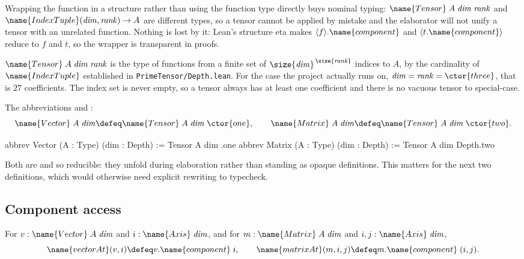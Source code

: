 Wrapping the function in a structure rather than using the function type
directly buys nominal typing: $\name{Tensor}\;A\;\mathit{dim}\;\mathit{rank}$
and $\name{IndexTuple}(\mathit{dim},\mathit{rank}) \to A$ are different
types, so a tensor cannot be applied by mistake and the elaborator will not
unify a tensor with an unrelated function.  Nothing is lost by it: Lean's
structure eta makes $\langle f \rangle.\name{component}$ and
$\langle t.\name{component} \rangle$ reduce to $f$ and $t$, so the wrapper is
transparent in proofs.

\begin{remark}[Size]\label{Tensor:Basic:rem:size}
$\name{Tensor}\;A\;\mathit{dim}\;\mathit{rank}$ is the type of functions from
a finite set of $\size{\mathit{dim}}^{\,\size{\mathit{rank}}}$ indices to $A$,
by the cardinality of $\name{IndexTuple}$ established in
\texttt{PrimeTensor/Depth.lean}.  For the case the project actually runs on,
$\mathit{dim} = \mathit{rank} = \ctor{three}$, that is $27$ coefficients.  The
index set is never empty, so a tensor always has at least one coefficient and
there is no vacuous tensor to special-case.
\end{remark}

\begin{definition}\label{Tensor:Basic:def:aliases}
The abbreviations  and :
\[
  \name{Vector}\;A\;\mathit{dim} \defeq
    \name{Tensor}\;A\;\mathit{dim}\;\ctor{one},
  \qquad
  \name{Matrix}\;A\;\mathit{dim} \defeq
    \name{Tensor}\;A\;\mathit{dim}\;\ctor{two}.
\]
\end{definition}

\begin{leancode}
abbrev Vector (A : Type) (dim : Depth) := Tensor A dim .one
abbrev Matrix (A : Type) (dim : Depth) := Tensor A dim Depth.two
\end{leancode}

Both are  and so reducible: they unfold during elaboration rather
than standing as opaque definitions.  This matters for the next two
definitions, which would otherwise need explicit rewriting to typecheck.

\subsection{Component access}
\label{Tensor:Basic:sec:access}

\begin{definition}
\label{Tensor:Basic:def:access}
For $v : \name{Vector}\;A\;\mathit{dim}$ and $i : \name{Axis}\;\mathit{dim}$,
and for $m : \name{Matrix}\;A\;\mathit{dim}$ and
$i, j : \name{Axis}\;\mathit{dim}$,
\[
  \name{vectorAt}(v, i) \defeq v.\name{component}\;i,
  \qquad
  \name{matrixAt}(m, i, j) \defeq m.\name{component}\;(i, j).
\]
\end{definition}

